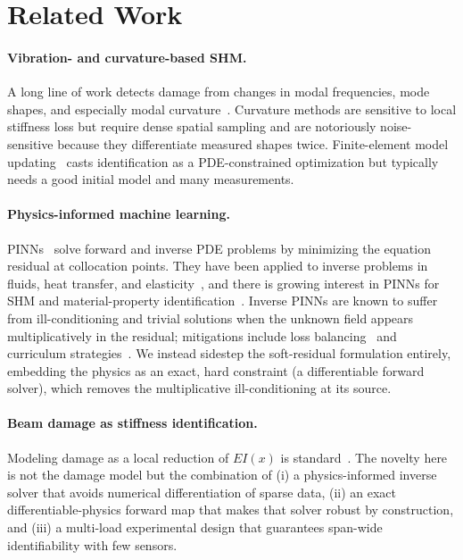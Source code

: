 \documentclass[11pt]{article}
\newcommand{\EI}{\mathit{EI}}
\begin{document}
\section{Related Work}
\paragraph{Vibration- and curvature-based SHM.}
A long line of work detects damage from changes in modal frequencies, mode
shapes, and especially modal curvature~\cite{pandey1991damage,kim2003damage,
fan2011vibration}. Curvature methods are sensitive to local stiffness loss but
require dense spatial sampling and are notoriously noise-sensitive because they
differentiate measured shapes twice. Finite-element model
updating~\cite{friswell1995finite} casts identification as a PDE-constrained
optimization but typically needs a good initial model and many measurements.

\paragraph{Physics-informed machine learning.}
PINNs~\cite{raissi2019physics,karniadakis2021physics} solve forward and inverse
PDE problems by minimizing the equation residual at collocation points. They have
been applied to inverse problems in fluids, heat transfer, and
elasticity~\cite{raissi2019physics,haghighat2021physics}, and there is growing
interest in PINNs for SHM and material-property
identification~\cite{zhang2020physics}. Inverse PINNs are known to suffer from
ill-conditioning and trivial solutions when the unknown field appears
multiplicatively in the residual; mitigations include loss
balancing~\cite{wang2021understanding} and curriculum
strategies~\cite{krishnapriyan2021characterizing}. We instead sidestep the
soft-residual formulation entirely, embedding the physics as an exact, hard
constraint (a differentiable forward solver), which removes the multiplicative
ill-conditioning at its source.

\paragraph{Beam damage as stiffness identification.}
Modeling damage as a local reduction of $\EI(x)$ is
standard~\cite{sinha2002simplified}. The novelty here is not the damage model but
the combination of (i) a physics-informed inverse solver that avoids numerical
differentiation of sparse data, (ii) an exact differentiable-physics forward map
that makes that solver robust by construction, and (iii) a multi-load experimental
design that guarantees span-wide identifiability with few sensors.
\end{document}
